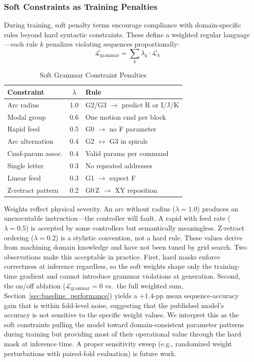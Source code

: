 \documentclass[11pt]{article}
\begin{document}
\subsubsection{Soft Constraints as Training Penalties}

During training, soft penalty terms encourage compliance with domain-specific rules beyond hard syntactic constraints. These define a weighted regular language---each rule $k$ penalizes violating sequences proportionally:
\begin{equation}
    \mathcal{L}_{\text{grammar}} = \sum_{k} \lambda_k \cdot \mathcal{L}_k
\end{equation}

\begin{table}[htbp]
\centering
\caption{Soft Grammar Constraint Penalties}
\label{tab:soft_constraints}
\small
\begin{tabular}{@{}lcp{3.8cm}@{}}
\toprule
\textbf{Constraint} & $\lambda$ & \textbf{Rule} \\
\midrule
Arc radius         & 1.0 & G2/G3 $\to$ predict R or I/J/K \\
Modal group        & 0.6 & One motion cmd per block \\
Rapid feed         & 0.5 & G0 $\to$ no F parameter \\
Arc alternation    & 0.4 & G2 $\leftrightarrow$ G3 in spirals \\
Cmd-param assoc.   & 0.4 & Valid params per command \\
Single letter      & 0.3 & No repeated addresses \\
Linear feed        & 0.3 & G1 $\to$ expect F \\
Z-retract pattern  & 0.2 & G0\,Z $\to$ XY reposition \\
\bottomrule
\end{tabular}
\normalsize
\end{table}

Weights reflect physical severity. An arc without radius ($\lambda=1.0$) produces an unexecutable instruction---the controller will fault. A rapid with feed rate ($\lambda=0.5$) is accepted by some controllers but semantically meaningless. Z-retract ordering ($\lambda=0.2$) is a stylistic convention, not a hard rule. These values derive from machining domain knowledge and have not been tuned by grid search. Two observations make this acceptable in practice. First, hard masks enforce correctness at inference regardless, so the soft weights shape only the training-time gradient and cannot introduce grammar violations at generation. Second, the on/off ablation ($\mathcal{L}_{\text{grammar}} = 0$ vs.\ the full weighted sum, Section~\ref{sec:baseline_performance}) yields a $+1.4$-pp mean sequence-accuracy gain that is within fold-level noise, suggesting that the published model's accuracy is not sensitive to the specific weight values. We interpret this as the soft constraints pulling the model toward domain-consistent parameter patterns during training but providing most of their operational value through the hard mask at inference time. A proper sensitivity sweep (e.g., randomized weight perturbations with paired-fold evaluation) is future work.
\end{document}
